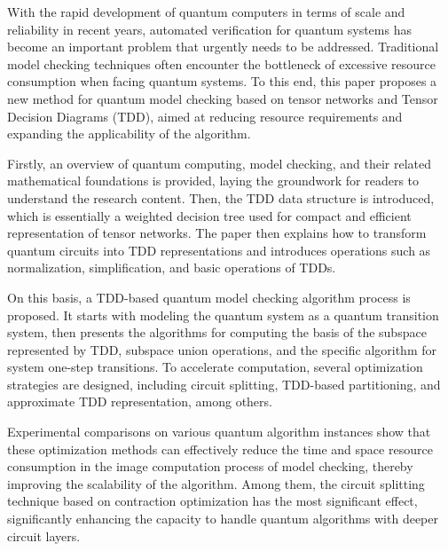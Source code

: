 
With the rapid development of quantum computers in terms of scale and reliability in recent years, automated verification for quantum systems has become an important problem that urgently needs to be addressed. Traditional model checking techniques often encounter the bottleneck of excessive resource consumption when facing quantum systems. To this end, this paper proposes a new method for quantum model checking based on tensor networks and Tensor Decision Diagrams (TDD), aimed at reducing resource requirements and expanding the applicability of the algorithm.

Firstly, an overview of quantum computing, model checking, and their related mathematical foundations is provided, laying the groundwork for readers to understand the research content. Then, the TDD data structure is introduced, which is essentially a weighted decision tree used for compact and efficient representation of tensor networks. The paper then explains how to transform quantum circuits into TDD representations and introduces operations such as normalization, simplification, and basic operations of TDDs.

On this basis, a TDD-based quantum model checking algorithm process is proposed. It starts with modeling the quantum system as a quantum transition system, then presents the algorithms for computing the basis of the subspace represented by TDD, subspace union operations, and the specific algorithm for system one-step transitions. To accelerate computation, several optimization strategies are designed, including circuit splitting, TDD-based partitioning, and approximate TDD representation, among others.

Experimental comparisons on various quantum algorithm instances show that these optimization methods can effectively reduce the time and space resource consumption in the image computation process of model checking, thereby improving the scalability of the algorithm. Among them, the circuit splitting technique based on contraction optimization has the most significant effect, significantly enhancing the capacity to handle quantum algorithms with deeper circuit layers.


